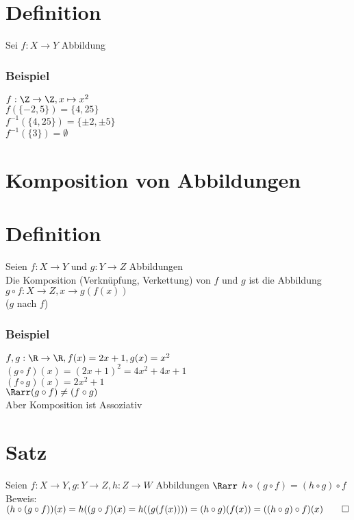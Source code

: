 \section{Definition}
Sei $f: X\to Y$ Abbildung\\
\subsubsection*{Beispiel}
$f:\Z \to \Z, x \mapsto x^2$\\
$f(\{-2, 5\}) = \{4, 25\}$\\
$f^{-1}(\{4, 25\}) = \{± 2, ±5\}$\\
$f^{-1}(\{3\}) = \emptyset$
\section*{Komposition von Abbildungen}
\section{Definition}
Seien $f:X\to Y$ und $g: Y\to Z$ Abbildungen\\
Die Komposition (Verknüpfung, Verkettung) von $f$ und $g$ ist die Abbildung\\
$g\circ f: X\to Z, x \to g(f(x))$\\
($g$ nach $f$)\\
\subsubsection*{Beispiel}
$f, g: \R \to \R, f(x) = 2x+1 , g(x) = x^2$\\
$(g \circ f)(x) = (2x+1)^2 = 4x^2 + 4x + 1$\\
$(f \circ g)(x) = 2x^2 + 1$\\
$\Rarr (g \circ f) \neq (f \circ g)$\\
Aber Komposition ist Assoziativ
\section{Satz}
Seien $f:X\to Y, g:Y\to Z, h:Z\to W$ Abbildungen $\Rarr$ $h \circ (g \circ f) = (h \circ g) \circ f$\\
Beweis: $(h\circ (g\circ f))(x) = h((g\circ f)(x) = h((g(f(x)))) = (h \circ g)(f(x)) = ((h \circ g) \circ f)(x) \qed$
